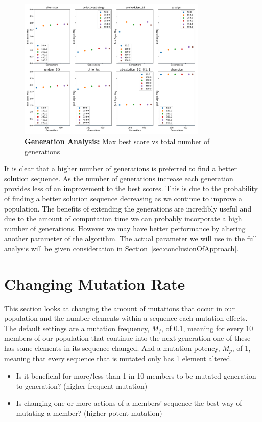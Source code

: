\begin{figure}[h] 
    \includegraphics[width=0.8\textwidth, keepaspectratio, center]{./img/plots/GENS_max_bs_v_gens_all.pdf}
\caption{\textbf{Generation Analysis:} Max best score vs total number of generations}\label{fig:GENS-max-bs-v-gens-all}
\end{figure}

It is clear that a higher number of generations is preferred to find a better solution sequence.
As the number of generations increase each generation provides less of an improvement to the best scores.
This is due to the probability of finding a better solution sequence decreasing as we continue to improve a population.
The benefits of extending the generations are incredibly useful and due to the amount of computation time we can probably incorporate a high number of generations. 
However we may have better performance by altering another parameter of the algorithm.
The actual parameter we will use in the full analysis will be given consideration in Section~\ref{sec:conclusionOfApproach}.

\section{Changing Mutation Rate}\label{sec:changeingmutationrate}
This section looks at changing the amount of mutations that occur in our population and the number elements within a sequence each mutation effects. 
The default settings are a mutation frequency, $M_f$, of 0.1, meaning for every 10 members of our population that continue into the next generation one of these has some elements in its sequence changed.
And a mutation potency, $M_p$, of 1, meaning that every sequence that is mutated only has 1 element altered.
\begin{itemize}
    \item Is it beneficial for more/less than 1 in 10 members to be mutated generation to generation? (higher frequent mutation)
    \item Is changing one or more actions of a members' sequence the best way of mutating a member? (higher potent mutation)
\end{itemize}

